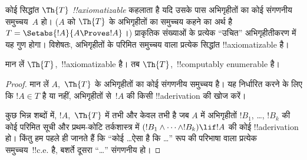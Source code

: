 \documentclass[../../../include/open-logic-section]{subfiles}
\begin{document}


कोई सिद्धांत $\Th{T}$ \emph{!!{axiomatizable}} कहलाता है यदि उसके पास
अभिगृहीतों का कोई संगणनीय समुच्चय~$A$ हो। ($A$ को $\Th{T}$ के अभिगृहीतों
का समुच्चय कहने का अर्थ है
$T = \Setabs{!A}{A \Proves !A}$।) प्राकृतिक संख्याओं के प्रत्येक
``उचित'' अभिगृहीतीकरण में यह गुण होगा। विशेषतः, अभिगृहीतों के परिमित
समुच्चय वाला प्रत्येक सिद्धांत !!{axiomatizable} है।

\begin{lem}
मान लें $\Th{T}$,~!!{axiomatizable} है। तब $\Th{T}$,~!!{computably
enumerable} है।
\end{lem}

\begin{proof}
मान लें $A$,~$\Th{T}$ के अभिगृहीतों का कोई संगणनीय समुच्चय है। यह निर्धारित
करने के लिए कि $!A \in T$ है या नहीं, अभिगृहीतों से~$!A$ की किसी
!!a{derivation} की खोज करें।

कुछ भिन्न शब्दों में, $!A$,~$\Th{T}$ में तभी और केवल तभी है जब $A$ में
अभिगृहीतों $!B_1$, \dots, $!B_k$ की कोई परिमित सूची और प्रथम-कोटि
तर्कशास्त्र में $(!B_1 \land \dots \land !B_k) \lif !A$ की कोई
!!a{derivation} हो। किंतु हम पहले ही जानते हैं कि ``कोई \dots ऐसा है कि
\dots'' रूप की परिभाषा वाला प्रत्येक समुच्चय~!!{c.e.} है, बशर्ते दूसरा
``\dots'' संगणनीय हो।
\end{proof}
\end{document}
